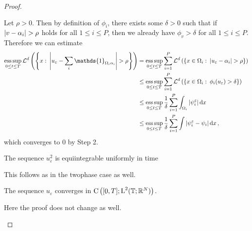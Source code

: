 \begin{proof}
\begin{description}[wide=0pt]
		Let $ \rho > 0 $. Then by definition of $ \phi_{ i } $, there exists some $ \delta > 0 $ such that if  
		$ \abs{ v - \alpha_{ i } } > \rho $ holds for all $ 1 \leq i \leq P $, then we already have $ \phi_{ v } > \delta $ for all $ 1 \leq i \leq P $.
		Therefore we can estimate
		\begin{align*}
			\esssup_{ 0 \leq t \leq T }
				\lm^{ d } \left(
					\left\{
						x 
						\, \colon \,
						\abs{ u_{ \varepsilon } - \sum_{ i } \mathds{ 1 }_{ \Omega_{ i } \alpha_{ i } } } > \rho 
					\right\}
				\right)
			& = 
			\esssup_{ 0 \leq t \leq T }
				\sum_{ i = 1 }^{ P }
					\lm^{ d }
						\left(
							\left\{
								x \in \Omega_{ i }
								\, \colon \,
								\abs{ u_{ \varepsilon } - \alpha_{ i } }
								> \rho
							\right\}	
						\right)
			\\
			& \leq
				\esssup_{ 0 \leq t \leq T }
					\sum_{ i = 1 }^{ P }
						\lm^{ d } \left(
							\left\{
								x \in \Omega_{ i }
								\, \colon \,
								\phi_{ i } ( u_{ \varepsilon } ) > \delta 
							\right\}
						\right)
			\\
			& \leq
			\esssup_{ 0 \leq t \leq T }
				\frac{ 1 }{ \delta }
				\sum_{ i = 1 }^{ P }
					\int_{ \Omega_{ i } }
						\abs{ \psi_{ i }^{ \varepsilon } }
					\dd{ x }
			\\
			& \leq
			\esssup_{ 0 \leq t \leq T }
				\frac{ 1 }{ \delta }
				\sum_{ i = 1 }^{ P }
					\int
						\abs{ \psi_{ i }^{ \varepsilon } - \psi_{ i } }
					\dd{ x },
		\end{align*}
		which converges to $ 0 $ by Step 2.
		
		\item[Step 4:] The sequence $ u_{ \varepsilon }^{ 2 } $ is equiintegrable uniformly in time
		
		This follows as in the twophase case as well.
		
		\item[Step 5:] The sequence $ u_{ \varepsilon } $ converges in $ \operatorname{C} \left( [ 0 , T ] ; \operatorname{L}^{ 2 } ( \operatorname{\mathbb{T}} ; \mathbb{ R }^{ N } ) \right) $.
		
		Here the proof does not change as well.
	\end{description}
\end{proof}


 
